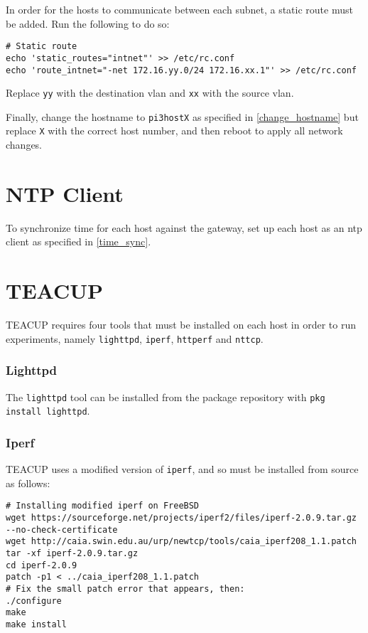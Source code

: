 In order for the hosts to communicate between each subnet, a static route must be added. Run the following to do so:

\begin{verbatim}
# Static route
echo 'static_routes="intnet"' >> /etc/rc.conf
echo 'route_intnet="-net 172.16.yy.0/24 172.16.xx.1"' >> /etc/rc.conf
\end{verbatim}

Replace \lstinline{yy} with the destination \gls{vlan} and \lstinline{xx} with the source \gls{vlan}.

Finally, change the hostname to \lstinline{pi3hostX} as specified in \ref{change_hostname} but replace \lstinline{X} with the correct host number, and then reboot to apply all network changes.


\section{NTP Client}

To synchronize time for each host against the gateway, set up each host as an \gls{ntp} client as specified in \ref{time_sync}.


\section{TEACUP}

TEACUP requires four tools that must be installed on each host in order to run experiments, namely \lstinline{lighttpd},  \lstinline{iperf}, \lstinline{httperf} and \lstinline{nttcp}.

\subsubsection{Lighttpd}

The \lstinline{lighttpd} tool can be installed from the package repository with \lstinline{pkg install lighttpd}.

\subsubsection{Iperf}

TEACUP uses a modified version of \lstinline{iperf}, and so must be installed from source as follows:

\begin{verbatim}
# Installing modified iperf on FreeBSD
wget https://sourceforge.net/projects/iperf2/files/iperf-2.0.9.tar.gz --no-check-certificate
wget http://caia.swin.edu.au/urp/newtcp/tools/caia_iperf208_1.1.patch
tar -xf iperf-2.0.9.tar.gz
cd iperf-2.0.9
patch -p1 < ../caia_iperf208_1.1.patch
# Fix the small patch error that appears, then:
./configure
make
make install
\end{verbatim}

